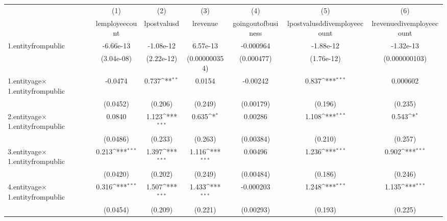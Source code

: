 {
\def\sym#1{\ifmmode^{#1}\else\(^{#1}\)\fi}
\begin{tabular}{l*{6}{c}}
\hline\hline
            &\multicolumn{1}{c}{(1)}&\multicolumn{1}{c}{(2)}&\multicolumn{1}{c}{(3)}&\multicolumn{1}{c}{(4)}&\multicolumn{1}{c}{(5)}&\multicolumn{1}{c}{(6)}\\
            &\multicolumn{1}{c}{lemployeecount}&\multicolumn{1}{c}{lpostvalusd}&\multicolumn{1}{c}{lrevenue}&\multicolumn{1}{c}{goingoutofbusiness}&\multicolumn{1}{c}{lpostvalusddivemployeecount}&\multicolumn{1}{c}{lrevenuedivemployeecount}\\
\hline
1.entityfrompublic&   -6.66e-13         &   -1.08e-12         &    6.57e-13         &   -0.000964         &   -1.88e-12         &   -1.32e-13         \\
            &  (3.04e-08)         &  (2.22e-12)         &(0.000000354)         &  (0.000477)         &  (1.76e-12)         &(0.000000103)         \\
[1em]
1.entityage$\times$1.entityfrompublic&     -0.0474         &       0.737\sym{**} &      0.0154         &    -0.00242         &       0.837\sym{***}&    0.000602         \\
            &    (0.0452)         &     (0.206)         &     (0.249)         &   (0.00179)         &     (0.196)         &     (0.235)         \\
[1em]
2.entityage$\times$1.entityfrompublic&      0.0840         &       1.123\sym{***}&       0.635\sym{*}  &     0.00286         &       1.108\sym{***}&       0.543\sym{*}  \\
            &    (0.0486)         &     (0.233)         &     (0.263)         &   (0.00384)         &     (0.210)         &     (0.257)         \\
[1em]
3.entityage$\times$1.entityfrompublic&       0.213\sym{***}&       1.397\sym{***}&       1.116\sym{***}&     0.00496         &       1.236\sym{***}&       0.902\sym{***}\\
            &    (0.0420)         &     (0.202)         &     (0.249)         &   (0.00484)         &     (0.186)         &     (0.246)         \\
[1em]
4.entityage$\times$1.entityfrompublic&       0.316\sym{***}&       1.507\sym{***}&       1.433\sym{***}&   -0.000203         &       1.248\sym{***}&       1.135\sym{***}\\
            &    (0.0454)         &     (0.209)         &     (0.221)         &   (0.00293)         &     (0.193)         &     (0.225)         \\

\end{tabular}}
